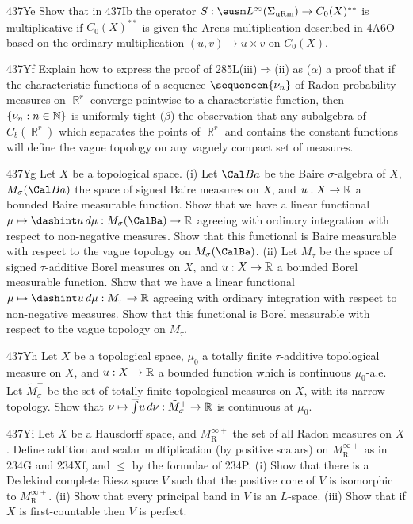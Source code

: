 {\spheader 437Ye
Show that in 437Ib the operator
$S:\eusm L^{\infty}(\Sigma_{\text{uRm}})\to C_0(X)^{**}$ is
multiplicative if $C_0(X)^{**}$ is given the Arens multiplication
described in 4A6O based on the ordinary multiplication
$(u,v)\mapsto u\times v$ on $C_0(X)$.

\spheader 437Yf Explain how to express the proof of
285L(iii)$\Rightarrow$(ii) as ($\alpha$) a proof that if the
characteristic functions of a sequence $\sequencen{\nu_n}$ of Radon
probability measures on $\BbbR^r$ converge pointwise to a characteristic
function, then $\{\nu_n:n\in\Bbb N\}$ is uniformly tight ($\beta$) the
observation that any subalgebra of $C_b(\BbbR^r)$ which separates the
points of $\BbbR^r$ and contains the constant functions will define the
vague topology on any vaguely compact set of measures.

\spheader 437Yg Let $X$ be a topological space.   (i)
Let $\Cal Ba$ be the Baire $\sigma$-algebra of $X$,
$M_{\sigma}(\Cal Ba)$ the space of signed Baire measures on
$X$, and $u:X\to\Bbb R$ a bounded Baire measurable function.   Show that
we have a linear functional
$\mu\mapsto\dashint u\,d\mu:M_{\sigma}(\CalBa)\to\Bbb R$ agreeing with
ordinary integration with respect to non-negative
measures.  Show that this functional is Baire
measurable with respect to the vague topology on $M_{\sigma}(\CalBa)$.
(ii) Let $M_{\tau}$ be the space of signed $\tau$-additive Borel
measures on $X$, and $u:X\to\Bbb R$ a bounded Borel measurable function.
Show that
we have a linear functional $\mu\mapsto\dashint u\,d\mu:M_{\tau}\to\Bbb R$
agreeing with ordinary integration with respect to non-negative
measures.  Show that this functional is Borel
measurable with respect to the vague topology on $M_{\tau}$.

\spheader 437Yh
Let $X$ be a topological space, $\mu_0$ a totally finite
$\tau$-additive topological measure on $X$, and $u:X\to\Bbb R$ a bounded
function which is continuous $\mu_0$-a.e.   Let $\tilde M_{\sigma}^+$
be the set of totally finite topological measures on $X$, with its narrow
topology.   Show that
$\nu\mapsto\overline{\int}u\,d\nu:\tilde M^+_{\sigma}\to\Bbb R$ is
continuous at $\mu_0$.

\spheader 437Yi Let $X$ be a Hausdorff space, and
$M^{\infty+}_{\text{R}}$ the set of all Radon measures on $X$.   Define
addition and scalar multiplication (by positive scalars) on
$M^{\infty+}_{\text{R}}$ as in 234G and
234Xf, and $\le$ by the formulae of 234P.
(i) Show that there is a Dedekind complete Riesz space $V$ such
that the positive cone of $V$ is isomorphic to
$M^{\infty+}_{\text{R}}$.   (ii) Show that every principal band in $V$
is an $L$-space.   (iii) Show that if $X$ is first-countable then $V$ is
perfect.

}
